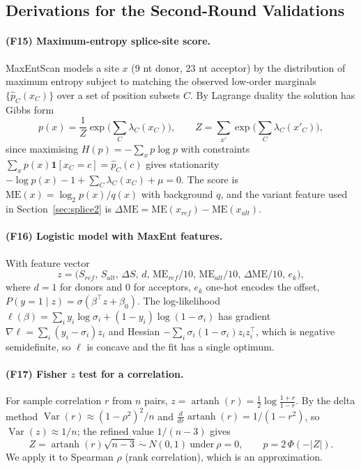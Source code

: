\subsection{Derivations for the Second-Round Validations}
\paragraph{(F15) Maximum-entropy splice-site score.} MaxEntScan \cite{yeo2004} models a
site $x$ (9 nt donor, 23 nt acceptor) by the distribution of maximum entropy
subject to matching the observed low-order marginals $\{\hat p_C(x_C)\}$ over a set of
position subsets $C$. By Lagrange duality the solution has Gibbs form
\begin{equation}
p(x)=\frac{1}{Z}\exp\Big(\sum_C \lambda_C(x_C)\Big),\qquad
Z=\sum_{x'}\exp\Big(\sum_C\lambda_C(x'_C)\Big),
\end{equation}
since maximising $H(p)=-\sum_x p\log p$ with constraints
$\sum_x p(x)\mathbf{1}[x_C=c]=\hat p_C(c)$ gives stationarity
$-\log p(x)-1+\sum_C\lambda_C(x_C)+\mu=0$. The score is
$\mathrm{ME}(x)=\log_2 p(x)/q(x)$ with background $q$, and the variant feature used in
Section~\ref{sec:splice2} is $\Delta\mathrm{ME}=\mathrm{ME}(x_{ref})-\mathrm{ME}(x_{alt})$.

\paragraph{(F16) Logistic model with MaxEnt features.} With feature vector
\begin{equation*}
z=\big(S_{ref},\,S_{alt},\,\Delta S,\,d,\,\mathrm{ME}_{ref}/10,\,\mathrm{ME}_{alt}/10,\,\Delta\mathrm{ME}/10,\,e_k\big),
\end{equation*}
where $d=1$ for donors and 0 for acceptors, $e_k$ one-hot encodes the offset, $P(y=1\mid z)=\sigma(\beta^\top z+\beta_0)$.
The log-likelihood $\ell(\beta)=\sum_i y_i\log\sigma_i+(1-y_i)\log(1-\sigma_i)$ has gradient
$\nabla\ell=\sum_i(y_i-\sigma_i)z_i$ and Hessian $-\sum_i\sigma_i(1-\sigma_i)z_iz_i^\top$,
which is negative semidefinite, so $\ell$ is concave and the fit has a single optimum.

\paragraph{(F17) Fisher $z$ test for a correlation.} For sample correlation $r$ from $n$
pairs, $z=\operatorname{artanh}(r)=\tfrac12\log\frac{1+r}{1-r}$. By the delta method
$\operatorname{Var}(r)\approx(1-\rho^2)^2/n$ and $\frac{d}{dr}\operatorname{artanh}(r)=1/(1-r^2)$, so
$\operatorname{Var}(z)\approx 1/n$; the refined value $1/(n-3)$ gives
\begin{equation}
Z=\operatorname{artanh}(r)\sqrt{n-3}\ \dot\sim\ N(0,1)\ \text{under}\ \rho=0,\qquad p=2\,\Phi(-|Z|).
\end{equation}
We apply it to Spearman $\rho$ (rank correlation), which is an approximation.

